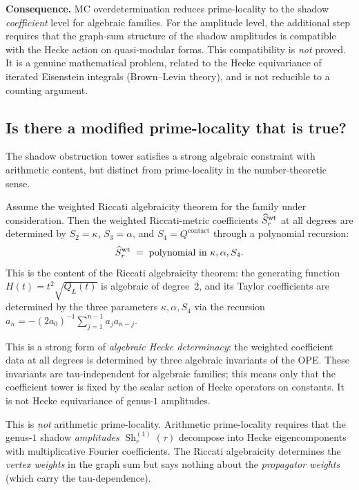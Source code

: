 \begin{remark}
\textbf{Consequence.} MC overdetermination reduces prime-locality
to the shadow \emph{coefficient} level for algebraic families.
For the amplitude level, the additional step requires that the
graph-sum structure of the shadow amplitudes is compatible with
the Hecke action on quasi-modular forms. This compatibility is
\emph{not} proved. It is a genuine mathematical problem,
related to the Hecke equivariance of iterated Eisenstein
integrals \textup{(}Brown--Levin theory\textup{)}, and is not
reducible to a counting argument.
\end{remark}

\subsection{Is there a modified prime-locality that is true?}%
\label{subsec:modified-prime-locality}

The shadow obstruction tower satisfies a strong algebraic constraint with
arithmetic content, but distinct from prime-locality in the
number-theoretic sense.

\begin{theorem}%
\label{thm:riccati-determinacy}%
Assume the weighted Riccati algebraicity theorem for the family under
consideration. Then the weighted Riccati-metric coefficients
$\widehat S^{\rm wt}_r$ at all degrees are determined by
$S_2 = \kappa$, $S_3 = \alpha$, and $S_4 = Q^{\mathrm{contact}}$
through a polynomial recursion:
\[
 \widehat S^{\rm wt}_r
 \;=\;
 \text{polynomial in $\kappa, \alpha, S_4$}.
\]
This is the content of the Riccati algebraicity theorem: the
generating function $H(t) = t^2\sqrt{Q_L(t)}$ is algebraic of
degree~$2$, and its Taylor coefficients are determined by
the three parameters $\kappa, \alpha, S_4$ via the recursion
$a_n = -(2a_0)^{-1}\sum_{j=1}^{n-1} a_j a_{n-j}$.

This is a strong form of \emph{algebraic Hecke determinacy}: the
weighted coefficient data at all degrees is determined by three
algebraic invariants of the OPE. These invariants are
tau-independent for algebraic families; this means only that the
coefficient tower is fixed by the scalar action of Hecke operators on
constants. It is not Hecke equivariance of genus-$1$ amplitudes.

This is \emph{not} arithmetic prime-locality. Arithmetic
prime-locality requires that the genus-$1$ shadow
\emph{amplitudes} $\operatorname{Sh}_r^{(1)}(\tau)$ decompose
into Hecke eigencomponents with multiplicative Fourier
coefficients. The Riccati algebraicity determines the
\emph{vertex weights} in the graph sum but says nothing about
the \emph{propagator weights} \textup{(}which carry the
tau-dependence\textup{)}.
\end{theorem}


